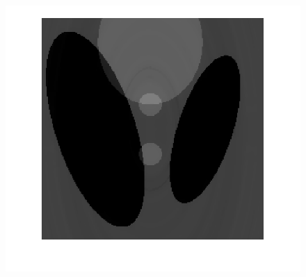 \documentclass[hyperref]{ctexart}
\begin{document}
{\begin{figure}[htbp]
{				\includegraphics[scale=0.2]{3-1.png}
			}
			\quad
			\quad
			\subfigure[pic5.]{
}
\end{figure}}
\end{document}
